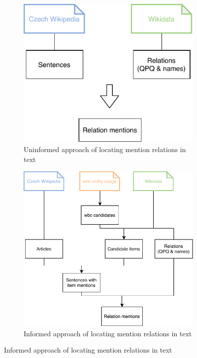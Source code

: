 \begin{figure}
\begin{subfigure}{1\textwidth}
\centering
\includegraphics[scale=0.8]{./img/Diplomka diagramy-uninformed} 
\caption{Uninformed approach of locating mention relations in text}

\label{obr:uninformed}
\end{subfigure}

\par\medskip
\qquad
\begin{subfigure}{1\textwidth}
\centering
\includegraphics[scale=0.8]{./img/Diplomka diagramy-informed} 
\caption{Informed approach of locating mention relations in text}

\label{obr:informed}
\end{subfigure}

\label{obr:informedvsuninformed}
\end{figure}


